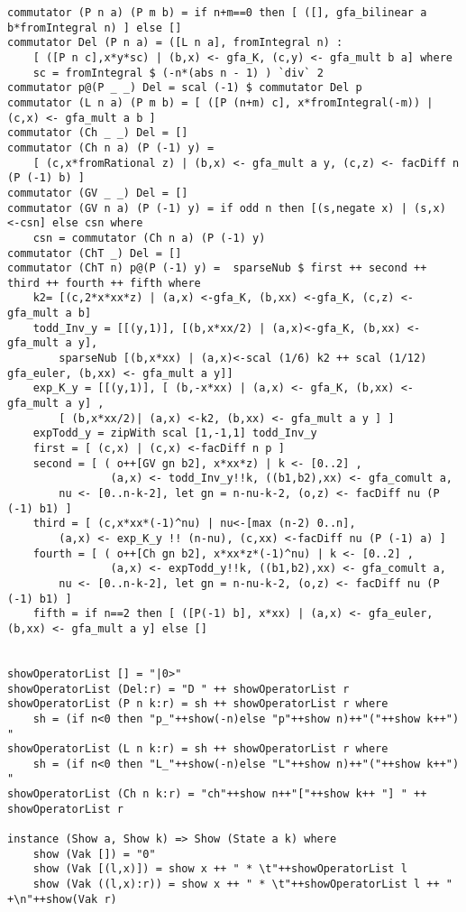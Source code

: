 \begin{lstlisting}
commutator (P n a) (P m b) = if n+m==0 then [ ([], gfa_bilinear a b*fromIntegral n) ] else []
commutator Del (P n a) = ([L n a], fromIntegral n) : 
	[ ([P n c],x*y*sc) | (b,x) <- gfa_K, (c,y) <- gfa_mult b a] where
	sc = fromIntegral $ (-n*(abs n - 1) ) `div` 2
commutator p@(P _ _) Del = scal (-1) $ commutator Del p
commutator (L n a) (P m b) = [ ([P (n+m) c], x*fromIntegral(-m)) | (c,x) <- gfa_mult a b ]
commutator (Ch _ _) Del = []
commutator (Ch n a) (P (-1) y) = 
	[ (c,x*fromRational z) | (b,x) <- gfa_mult a y, (c,z) <- facDiff n (P (-1) b) ]
commutator (GV _ _) Del = []
commutator (GV n a) (P (-1) y) = if odd n then [(s,negate x) | (s,x) <-csn] else csn where
	csn = commutator (Ch n a) (P (-1) y) 
commutator (ChT _) Del = []
commutator (ChT n) p@(P (-1) y) =  sparseNub $ first ++ second ++ third ++ fourth ++ fifth where
	k2= [(c,2*x*xx*z) | (a,x) <-gfa_K, (b,xx) <-gfa_K, (c,z) <- gfa_mult a b]
	todd_Inv_y = [[(y,1)], [(b,x*xx/2) | (a,x)<-gfa_K, (b,xx) <- gfa_mult a y],  
		sparseNub [(b,x*xx) | (a,x)<-scal (1/6) k2 ++ scal (1/12) gfa_euler, (b,xx) <- gfa_mult a y]]
	exp_K_y = [[(y,1)], [ (b,-x*xx) | (a,x) <- gfa_K, (b,xx) <- gfa_mult a y] ,
		[ (b,x*xx/2)| (a,x) <-k2, (b,xx) <- gfa_mult a y ] ]
	expTodd_y = zipWith scal [1,-1,1] todd_Inv_y
	first = [ (c,x) | (c,x) <-facDiff n p ]
	second = [ ( o++[GV gn b2], x*xx*z) | k <- [0..2] , 
				(a,x) <- todd_Inv_y!!k, ((b1,b2),xx) <- gfa_comult a, 
		nu <- [0..n-k-2], let gn = n-nu-k-2, (o,z) <- facDiff nu (P (-1) b1) ]
	third = [ (c,x*xx*(-1)^nu) | nu<-[max (n-2) 0..n], 
		(a,x) <- exp_K_y !! (n-nu), (c,xx) <-facDiff nu (P (-1) a) ]
	fourth = [ ( o++[Ch gn b2], x*xx*z*(-1)^nu) | k <- [0..2] , 
				(a,x) <- expTodd_y!!k, ((b1,b2),xx) <- gfa_comult a, 
		nu <- [0..n-k-2], let gn = n-nu-k-2, (o,z) <- facDiff nu (P (-1) b1) ]
	fifth = if n==2 then [ ([P(-1) b], x*xx) | (a,x) <- gfa_euler, (b,xx) <- gfa_mult a y] else []


showOperatorList [] = "|0>"
showOperatorList (Del:r) = "D " ++ showOperatorList r
showOperatorList (P n k:r) = sh ++ showOperatorList r where
	sh = (if n<0 then "p_"++show(-n)else "p"++show n)++"("++show k++") "
showOperatorList (L n k:r) = sh ++ showOperatorList r where
	sh = (if n<0 then "L_"++show(-n)else "L"++show n)++"("++show k++") "
showOperatorList (Ch n k:r) = "ch"++show n++"["++show k++ "] " ++ showOperatorList r 

instance (Show a, Show k) => Show (State a k) where
	show (Vak []) = "0"
	show (Vak [(l,x)]) = show x ++ " * \t"++showOperatorList l
	show (Vak ((l,x):r)) = show x ++ " * \t"++showOperatorList l ++ " +\n"++show(Vak r) 




\end{lstlisting}
